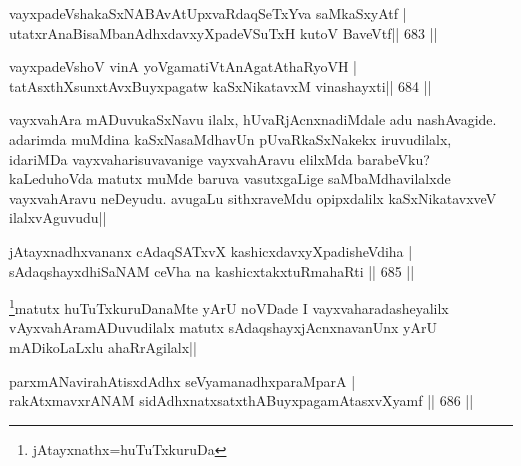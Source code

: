 
\begin{shl}
vayxpadeVshakaSxNABAvAtUpxvaRdaqSeTxYva saMkaSxyAtf | \\
utatxrAnaBisaMbanAdhxdavxyXpadeVSuTxH kutoV BaveVtf\hfill ||  683 ||  
\end{shl}

\begin{shl}
vayxpadeVshoV vinA yoVgamatiVtAnAgatAthaRyoVH | \\
tatAsxthXsunxtAvxBuyxpagatw kaSxNikatavxM vinashayxti\hfill ||  684 ||  
\end{shl}

\begin{artha}
vayxvahAra mADuvukaSxNavu ilalx, hUvaRjAcnxnadiMdale adu nashAvagide. adarimda muMdina kaSxNasaMdhavUn pUvaRkaSxNakekx iruvudilalx, idariMDa vayxvaharisuvavanige vayxvahAravu elilxMda barabeVku? kaLeduhoVda matutx muMde baruva vasutxgaLige saMbaMdhavilalxde vayxvahAravu neDeyudu. avugaLu sithxraveMdu opipxdalilx kaSxNikatavxveV ilalxvAguvudu||
\end{artha}

\begin{shl}
jAtayxnadhxvananx cAdaqSATxvX kashicxdavxyXpadisheVdiha | \\
sAdaqshayxdhiSaNAM ceVha na kashicxtakxtuRmahaRti \hfill||  685 ||  
\end{shl}

\begin{artha}
\footnote{jAtayxnathx=huTuTxkuruDa}matutx huTuTxkuruDanaMte yArU noVDade I vayxvaharadasheyalilx vAyxvahAramADuvudilalx matutx sAdaqshayxjAcnxnavanUnx yArU mADikoLaLxlu ahaRrAgilalx||
\end{artha}

\begin{shl}
parxmANavirahAtisxdAdhx seVyamanadhxparaMparA | \\
rakAtxmavxrANAM sidAdhxnatxsatxthA\s BuyxpagamAtasxvXyamf \hfill||  686 ||  
\end{shl}

